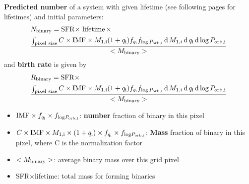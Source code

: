\documentclass{article}
\begin{document}
\begin{minipage}{0.5\linewidth}
	\textbf{Predicted number} of a system with given lifetime (see following pages for lifetimes) and initial parameters:
\begin{equation*}
	\begin{split}
		& N_\mathrm{binary} = \mathrm{ SFR\times}\, {\rm \,lifetime\,}\times\\
		&\frac{ \int_{\rm pixel~size}C\times  \mathrm{IMF}\times M_{\rm 1,i}(1+q_{\rm i})  f_{q_\mathrm{i}} f_{\mathrm{log}\,P_\mathrm{orb,i}} 
	{\rm \,d\,} M_{\mathrm 1,i}{\rm \,d\,} q_\mathrm{i} {\rm \,d\,} \mathrm{log}\,P_\mathrm{orb,i}}
	{<M_{\rm binary}>}
	\end{split}
\end{equation*}
	and \textbf{birth rate} is given by
\begin{equation*}
	\begin{split}
		& R_\mathrm{binary} = \mathrm{ SFR\times}\\
		&\frac{ \int_{\rm pixel~size} C\times \mathrm{IMF}\times M_{\rm 1,i}(1+q_{\rm i})  f_{q_\mathrm{i}} f_{\mathrm{log}\,P_\mathrm{orb,i}} 
	{\rm \,d\,} M_{\mathrm 1,i}{\rm \,d\,} q_\mathrm{i} {\rm \,d\,} \mathrm{log}\,P_\mathrm{orb,i}}
	{<M_{\rm binary}>}
	\end{split}
\end{equation*}

	\begin{itemize}
		\item ${\rm IMF}\times f_{q_{\rm i}} \times f_{{\rm log}P_{\rm orb,i}}$: \textbf{number} fraction of binary in this pixel
		\item $C\times{\rm IMF}\times M_{\rm 1,i}\times(1+q_{\rm i}) \times f_{q_{\rm i}} \times f_{{\rm log}P_{\rm orb,i}}$: \textbf{Mass} fraction of binary in this pixel, where C is the normalization factor
		\item $<M_{\rm binary}>$: average binary mass over this grid pixel 
		\item SFR$\times$lifetime: total mass for forming binaries
	\end{itemize}
\end{minipage}\newline



\end{document}
